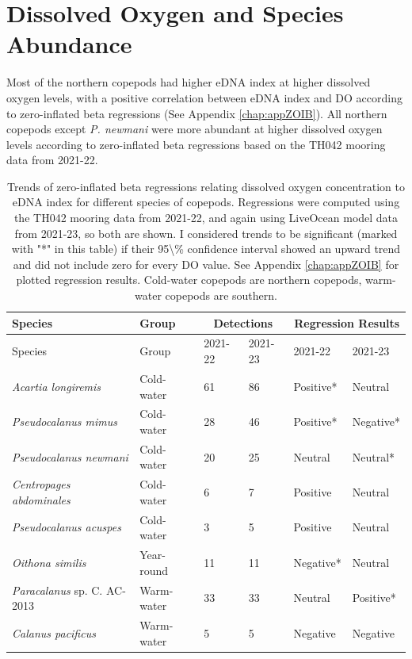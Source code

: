 \documentclass[12pt,twoside]{reedthesis}
\begin{document}
{	%
	
	\section{Dissolved Oxygen and Species Abundance}  
	
	Most of the northern copepods had higher eDNA index at higher dissolved oxygen levels, with a positive correlation between eDNA index and DO according to zero-inflated beta regressions (See Appendix \ref{chap:appZOIB}). All northern copepods except \textit{P. newmani} were more abundant at higher dissolved oxygen levels according to zero-inflated beta regressions based on the TH042 mooring data from 2021-22.
	
	\begin{table}[!h] 
			\begin{tabular}{l | l | l l | l l}
				\toprule
				Species & Group & \multicolumn{2}{|c|}{Detections} & \multicolumn{2}{|c}{Regression Results} \tabularnewline
				\midrule
				Species &  Group & 2021-22 & 2021-23 & 2021-22 & 2021-23  \\ 
				\midrule 
				\textit{Acartia longiremis}	& Cold-water & 61 & 86 & Positive* & Neutral  \\
				\textit{Pseudocalanus mimus} & Cold-water & 28  & 46 & Positive* & Negative*  \\
				\textit{Pseudocalanus newmani}	& Cold-water & 20  & 25 & Neutral & Neutral* \\
				\textit{Centropages abdominales} & Cold-water & 6 & 7 & Positive & Neutral   \\
				\textit{Pseudocalanus acuspes}  & Cold-water & 3  & 5 & Positive & Neutral  \\
				\textit{Oithona similis} & Year-round & 11  & 11 & Negative* & Neutral \\
				\textit{Paracalanus} sp. C. AC-2013 & Warm-water & 33  & 33 & Neutral & Positive*  \\
				\textit{Calanus pacificus}	& Warm-water & 5  & 5 & Negative & Negative  \\
				\bottomrule 
			\end{tabular}
			\label{ZOIBtab}
			\caption[Zero-inflated beta regression results]{Trends of zero-inflated beta regressions relating dissolved oxygen concentration to eDNA index for different species of copepods. Regressions were computed using the TH042 mooring data from 2021-22, and again using LiveOcean model data from 2021-23, so both are shown. I considered trends to be significant (marked with "*" in this table) if their 95\textbackslash{}\% confidence interval showed an upward trend and did not include zero for every DO value. See Appendix \ref{chap:appZOIB} for plotted regression results. Cold-water copepods are northern copepods, warm-water copepods are southern.}  
	\end{table}
	
}
\end{document}
